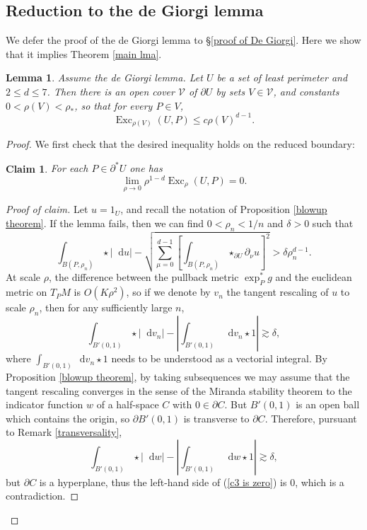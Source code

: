 \documentclass[reqno,10pt]{amsart}
\DeclareMathOperator{\Exc}{Exc}
\newcommand*\dif{\mathop{}\!\mathrm{d}}
\newtheorem{lemma}[theorem]{Lemma}
\newtheorem{claim}{Claim}[theorem]
\theoremstyle{definition}
\numberwithin{equation}{section}
\begin{document}
\subsection{Reduction to the de Giorgi lemma}
We defer the proof of the de Giorgi lemma to \S\ref{proof of De Giorgi}.
Here we show that it implies Theorem \ref{main lma}.

\begin{lemma}
Assume the de Giorgi lemma.
Let $U$ be a set of least perimeter and $2 \leq d \leq 7$.
Then there is an open cover $\mathcal V$ of $\partial U$ by sets $V \in \mathcal V$, and constants $0 < \rho(V) < \rho_*$, so that for every $P \in V$,
$$\Exc_{\rho(V)}(U, P) \leq c\rho(V)^{d - 1}.$$
\end{lemma}
\begin{proof}
We first check that the desired inequality holds on the reduced boundary:

\begin{claim}
For each $P \in \partial^* U$ one has
$$\lim_{\rho \to 0} \rho^{1 - d} \Exc_\rho(U, P) = 0.$$
\end{claim}
\begin{proof}[Proof of claim]
Let $u = 1_U$, and recall the notation of Proposition \ref{blowup theorem}. If the lemma fails, then we can find $0 < \rho_n < 1/n$ and $\delta > 0$ such that 
$$\int_{B(P, \rho_n)} \star |\dif u| - \sqrt{\sum_{\mu = 0}^{d - 1} \left[\int_{B(P, \rho_n)} \star_{\partial U} \partial_\nu u\right]^2} > \delta \rho_n^{d - 1}.$$
At scale $\rho$, the difference between the pullback metric $\exp_P^* g$ and the euclidean metric on $T_PM$ is $O(K\rho^2)$, so if we denote by $v_n$ the tangent rescaling of $u$ to scale $\rho_n$, then for any sufficiently large $n$,
$$\int_{B'(0, 1)} \star |\dif v_n| - \left|\int_{B'(0, 1)} \dif v_n \star 1\right| \gtrsim \delta,$$
where $\int_{B'(0, 1)} \dif v_n \star 1$ needs to be understood as a vectorial integral.
By Proposition \ref{blowup theorem}, by taking subsequences we may assume that the tangent rescaling converges in the sense of the Miranda stability theorem to the indicator function $w$ of a half-space $C$ with $0 \in \partial C$.
But $B'(0, 1)$ is an open ball which contains the origin, so $\partial B'(0, 1)$ is transverse to $\partial C$.
Therefore, pursuant to Remark \ref{transversality},
\begin{equation}\label{c3 is zero}
\int_{B'(0, 1)} \star |\dif w| - \left|\int_{B'(0, 1)} \dif w \star 1\right| \gtrsim \delta,
\end{equation}
but $\partial C$ is a hyperplane, thus the left-hand side of (\ref{c3 is zero}) is $0$, which is a contradiction.
\end{proof}


\end{proof}
\end{document}
